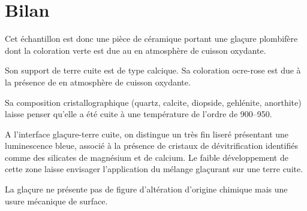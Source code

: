 \section{Bilan}

Cet échantillon est donc une pièce de céramique portant une 
glaçure plombifère dont la coloration verte est due au  
en atmosphère de cuisson oxydante.

Son support de terre cuite est de type calcique. Sa coloration 
ocre-rose est due à la présence de  en atmosphère de 
cuisson oxydante.

Sa composition cristallographique (quartz, calcite, diopside, 
gehlénite, anorthite) laisse penser qu'elle a été cuite à une 
température de l'ordre de 
\SIrange[range-phrase=\ à\ ]{900}{950}{\degC}.

A l'interface glaçure-terre cuite, on distingue un très fin liseré 
présentant une luminescence bleue, associé à la présence de cristaux 
de dévitrification identifiés comme des silicates de magnésium et de 
calcium. Le faible développement de cette zone laisse envisager 
l'application du mélange glaçurant sur une terre cuite.

La glaçure ne présente pas de figure d'altération d'origine chimique 
mais une usure mécanique de surface.
